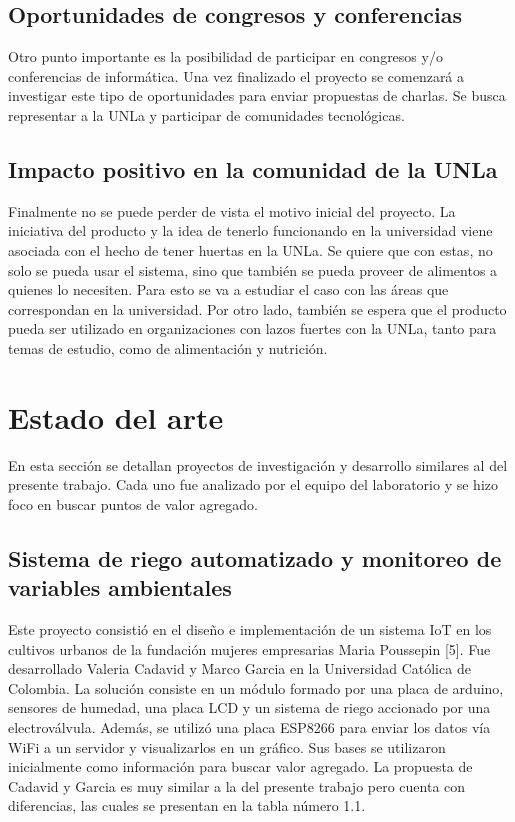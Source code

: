 \subsection{Oportunidades de congresos y conferencias}
Otro punto importante es la posibilidad de participar en congresos y/o conferencias de informática. Una vez finalizado el proyecto se comenzará a investigar este tipo de oportunidades para enviar propuestas de charlas. Se busca representar a la UNLa y participar de comunidades tecnológicas.

\subsection{Impacto positivo en la comunidad de la UNLa}
Finalmente no se puede perder de vista el motivo inicial del proyecto. La iniciativa del producto y la idea de tenerlo funcionando en la universidad viene asociada con el hecho de tener huertas en la UNLa. Se quiere que con estas, no solo se pueda usar el sistema, sino que también se pueda proveer de alimentos a quienes lo necesiten. Para esto se va a estudiar el caso con las áreas que correspondan en la universidad. Por otro lado, también se espera que el producto pueda ser utilizado en organizaciones con lazos fuertes con la UNLa, tanto para temas de estudio, como de alimentación y nutrición.


\section{Estado del arte}
En esta sección se detallan proyectos de investigación y desarrollo similares al del presente trabajo. Cada uno fue analizado por el equipo del laboratorio y se hizo foco en buscar puntos de valor agregado.\\

\subsection{Sistema de riego automatizado y monitoreo de variables ambientales}
Este proyecto consistió en el diseño e implementación de un sistema IoT en los cultivos urbanos de la fundación mujeres empresarias Maria Poussepin [5].
Fue desarrollado Valeria Cadavid y Marco Garcia en la Universidad Católica de Colombia.
La solución consiste en un módulo formado por una placa de arduino, sensores de humedad, una placa LCD y un sistema de riego accionado por una electroválvula. Además, se utilizó una placa ESP8266 para enviar los datos vía WiFi a un servidor y visualizarlos en un gráfico. Sus bases se utilizaron inicialmente como información para buscar valor agregado. La propuesta de Cadavid y Garcia es muy similar a la del presente trabajo pero cuenta con diferencias, las cuales se presentan en la tabla número 1.1.\\

